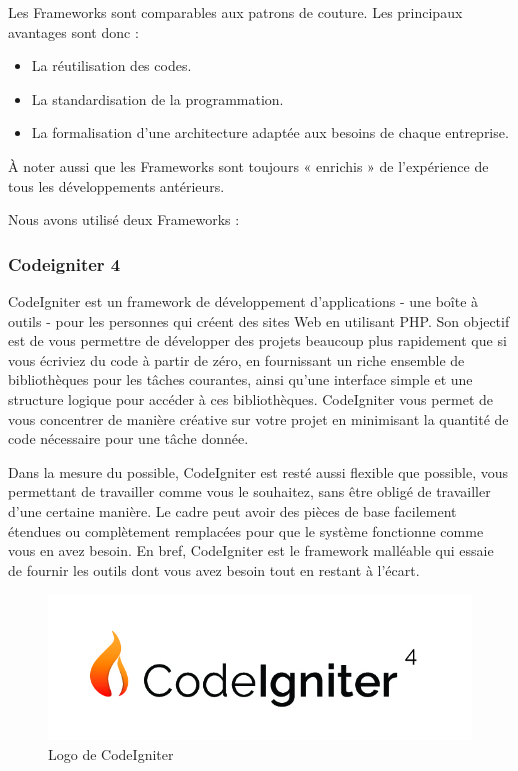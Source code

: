 \documentclass[french]{report}
\begin{document}
Les Frameworks sont comparables aux patrons de couture. Les principaux avantages
sont donc :

\begin{itemize}
    \item La réutilisation des codes.
    \item La standardisation de la programmation.
    \item La formalisation d'une architecture adaptée aux besoins de chaque
        entreprise.
\end{itemize}

À noter aussi que les Frameworks sont toujours « enrichis » de l'expérience de
tous les développements antérieurs.

Nous avons utilisé deux Frameworks :

\subsubsection{Codeigniter 4}

CodeIgniter est un framework de développement d'applications - une boîte à
outils - pour les personnes qui créent des sites Web en utilisant PHP. Son
objectif est de vous permettre de développer des projets beaucoup plus
rapidement que si vous écriviez du code à partir de zéro, en fournissant un
riche ensemble de bibliothèques pour les tâches courantes, ainsi qu'une
interface simple et une structure logique pour accéder à ces bibliothèques.
CodeIgniter vous permet de vous concentrer de manière créative sur votre projet
en minimisant la quantité de code nécessaire pour une tâche donnée.

Dans la mesure du possible, CodeIgniter est resté aussi flexible que possible,
vous permettant de travailler comme vous le souhaitez, sans être obligé de
travailler d'une certaine manière. Le cadre peut avoir des pièces de base
facilement étendues ou complètement remplacées pour que le système fonctionne
comme vous en avez besoin. En bref, CodeIgniter est le framework malléable qui
essaie de fournir les outils dont vous avez besoin tout en restant à l'écart.

\begin{figure}[H]
    \centering
    \includegraphics[width=1\textwidth]{images/ci-new-logo-04-02.jpg}
    \caption{Logo de CodeIgniter}
    \label{fig:my_label}
\end{figure}
\end{document}
